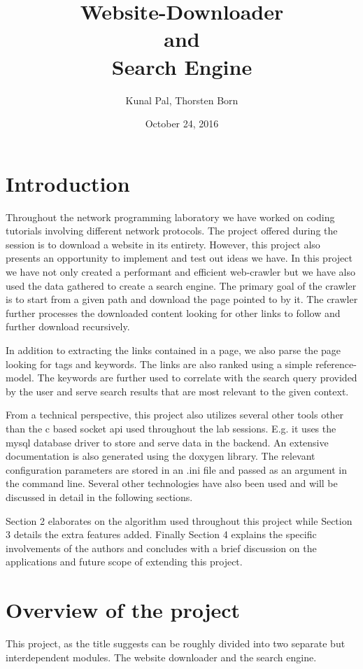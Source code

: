 \documentclass{project_report}
\title{Website-Downloader \\and \\Search Engine}
\author{Kunal Pal, Thorsten Born}
\date{October 24, 2016}
\begin{document}
\maketitle

\section{Introduction} 

Throughout the network programming laboratory we have worked on coding tutorials involving different network protocols. The project offered during the session is to download a website in its entirety. However, this project also presents an opportunity to implement and test out ideas we have. In this project we have not only created a performant and efficient web-crawler but we have also used the data gathered to create a search engine. The primary goal of the crawler is to start from a given path and download the page pointed to by it. The crawler further processes the downloaded content looking for other links to follow and further download recursively.

In addition to extracting the links contained in a page, we also parse the page looking for tags and keywords. The links are also ranked using a simple reference-model. The keywords are further used to correlate with the search query provided by the user and serve search results that are most relevant to the given context.

From a technical perspective, this project also utilizes several other tools other than the c based socket api used throughout the lab sessions. E.g. it uses the mysql database driver to store and serve data in the backend. An extensive documentation is also generated using the doxygen library. The relevant configuration parameters are stored in an .ini file and passed as an argument in the command line. Several other technologies have also been used and will be discussed in detail in the following sections.

Section 2 elaborates on the algorithm used throughout this project while Section 3 details the extra features added. Finally Section 4 explains the specific involvements of the authors and concludes with a brief discussion on the applications and future scope of extending this project.

\section{Overview of the project}
This project, as the title suggests can be roughly divided into two separate but interdependent modules. The website downloader and the search engine. 
\end{document}
